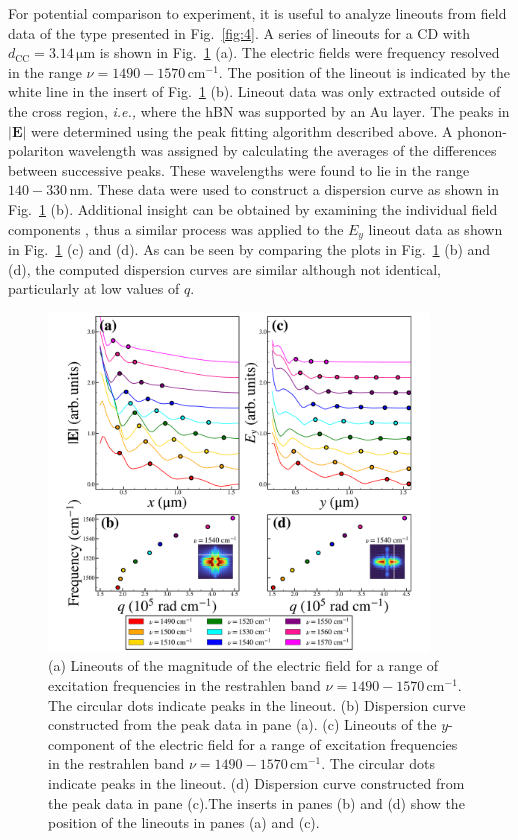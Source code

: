 \documentclass[preprint,
amsmath,amssymb,
aip,
jap,
floatfix,]{revtex4-2}
\begin{document}
				For potential comparison to experiment, it is useful to analyze lineouts from field data of the type presented in Fig.~\ref{fig:4}. A series of lineouts for a CD with $d_\mathrm{CC} = 3.14 \, \si{\um}$ is shown in Fig.~\ref{fig:5} (a). The electric fields were frequency resolved in the range $\nu = 1490 - 1570 \, \mathrm{cm}^{-1}$. The position of the lineout is indicated by the white line in the insert of Fig.~\ref{fig:5} (b). Lineout data was only extracted outside of the cross region, \textit{i.e.,} where the hBN was supported by an Au layer. The peaks in $|\bm{E}|$ were determined using the peak fitting algorithm described above. A phonon-polariton wavelength was assigned by calculating the averages of the differences between successive peaks. These wavelengths were found to lie in the range $140 - 330 \, \si{\nm}$. These data were used to construct a dispersion curve as shown in Fig.~\ref{fig:5} (b). Additional insight can be obtained by examining the individual field components \cite{Klein:2014}, thus  a similar process was applied to the $E_y$ lineout data as shown in Fig.~\ref{fig:5} (c) and (d). As can be seen by comparing the plots in Fig.~\ref{fig:5} (b) and (d), the computed dispersion curves are similar although not identical, particularly at low values of $q$. 

				\begin{figure}[!htb]
				  \includegraphics[width=0.9\textwidth]{Figures/Fig5.pdf} 
				  \caption{(a) Lineouts of the magnitude of the electric field for a range of excitation frequencies in the restrahlen band $\nu = 1490 - 1570\, \mathrm{cm}^{-1}$. The circular dots indicate peaks in the lineout. (b) Dispersion curve constructed from the peak data in pane (a). (c) Lineouts of the $y$-component of the electric field for a range of excitation frequencies in the restrahlen band $\nu = 1490 - 1570\, \mathrm{cm}^{-1}$. The circular dots indicate peaks in the lineout. (d) Dispersion curve constructed from the peak data in pane (c).The inserts in panes (b) and (d) show the position of the lineouts in panes (a) and (c).
				  }
				  \label{fig:5}
				\end{figure}	
\end{document}
